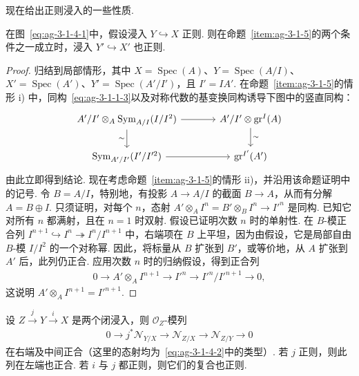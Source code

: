 现在给出正则浸入的一些性质.
\begin{proposition}\label{item:ag-3-1-14}
在图~\eqref{eq:ag-3-1-4-1}中，假设浸入 $Y\hookrightarrow X$ 正则. 则在命题~\ref{item:ag-3-1-5}的两个条件之一成立时，浸入 $Y'\hookrightarrow X'$ 也正则.
\end{proposition}
\begin{proof}
归结到局部情形，其中 $X=\operatorname{Spec}(A)$、$Y=\operatorname{Spec}(A/I)$、$X'=\operatorname{Spec}(A')$、$Y'=\operatorname{Spec}(A'/I')$，且 $I'=IA'$. 在命题~\ref{item:ag-3-1-5}的情形 i) 中，同构~\eqref{eq:ag-3-1-1-3}以及对称代数的基变换同构诱导下图中的竖直同构：
\begin{align*}
\begin{tikzcd}[ampersand replacement=\&,column sep=large]
A'/I'\otimes_A\operatorname{Sym}_{A/I}(I/I^2)\arrow[r]\arrow[d,"\sim"'] \& A'/I'\otimes\operatorname{gr}^{I}(A)\arrow[d,"\sim"] \\
\operatorname{Sym}_{A'/I'}(I'/I'^2)\arrow[r] \& \operatorname{gr}^{I'}(A')
\end{tikzcd}
\end{align*}
由此立即得到结论.
现在考虑命题~\ref{item:ag-3-1-5}的情形 ii)，并沿用该命题证明中的记号. 令 $B=A/I$，特别地，有投影 $A\longrightarrow A/I$ 的截面 $B\longrightarrow A$，从而有分解 $A=B\oplus I$. 只须证明，对每个 $n$，态射 $A'\otimes_A I^n=B'\otimes_B I^n\longrightarrow I'^n$ 是同构. 已知它对所有 $n$ 都满射，且在 $n=1$ 时双射. 假设已证明次数 $n$ 时的单射性. 在 $B$-模正合列 $I^{n+1}\hookrightarrow I^n\twoheadrightarrow I^n/I^{n+1}$ 中，右端项在 $B$ 上平坦，因为由假设，它是局部自由 $B$-模 $I/I^2$ 的一个对称幂. 因此，将标量从 $B$ 扩张到 $B'$，或等价地，从 $A$ 扩张到 $A'$ 后，此列仍正合. 应用次数 $n$ 时的归纳假设，得到正合列
\begin{align*}
0\longrightarrow A'\otimes_A I^{n+1}\longrightarrow I'^n\longrightarrow I'^n/I'^{n+1}\longrightarrow0,
\end{align*}
这说明 $A'\otimes_A I^{n+1}=I'^{n+1}$.
\end{proof}
\begin{proposition}\label{item:ag-3-1-15}
设 $Z\xrightarrow jY\xrightarrow iX$ 是两个闭浸入，则 $\mathcal O_Z$-模列
\begin{align*}
0\longrightarrow j^*\mathcal N_{Y/X}\longrightarrow\mathcal N_{Z/X}\longrightarrow\mathcal N_{Z/Y}\longrightarrow0
\end{align*}
在右端及中间正合（这里的态射均为~\eqref{eq:ag-3-1-4-2}中的类型）. 若 $j$ 正则，则此列在左端也正合. 若 $i$ 与 $j$ 都正则，则它们的复合也正则.
\end{proposition}
